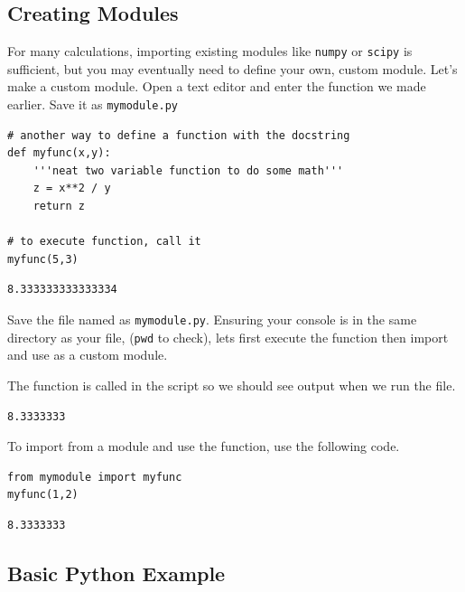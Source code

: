 \documentclass[%
oneside,                 %
final,                   %
10pt]{article}
\begin{document}
\subsection{Creating Modules}

For many calculations, importing existing modules like \texttt{numpy} or \texttt{scipy} is sufficient, but you may eventually need to define your own, custom module. Let's make a custom module. Open a text editor and enter the function we made earlier. Save it as \texttt{mymodule.py}

\begin{Verbatim}[numbers=none,fontsize=\fontsize{9pt}{9pt},baselinestretch=0.95,xleftmargin=2mm]
# another way to define a function with the docstring
def myfunc(x,y):
    '''neat two variable function to do some math'''
    z = x**2 / y
    return z

# to execute function, call it
myfunc(5,3)
\end{Verbatim}

\begin{Verbatim}[numbers=none,fontsize=\fontsize{9pt}{9pt},baselinestretch=0.95,xleftmargin=2mm]
8.333333333333334
\end{Verbatim}

Save the file named as \texttt{mymodule.py}. Ensuring your console is in the same directory as your file, (\texttt{pwd} to check), lets first execute the function then import and use as a custom module.

The function is called in the script so we should see output when we run the file.
\begin{Verbatim}[numbers=none,fontsize=\fontsize{9pt}{9pt},baselinestretch=0.95,xleftmargin=2mm]
8.3333333
\end{Verbatim}

To import from a module and use the function, use the following code.

\begin{Verbatim}[numbers=none,fontsize=\fontsize{9pt}{9pt},baselinestretch=0.95,xleftmargin=2mm]
from mymodule import myfunc
myfunc(1,2)
\end{Verbatim}

\begin{Verbatim}[numbers=none,fontsize=\fontsize{9pt}{9pt},baselinestretch=0.95,xleftmargin=2mm]
8.3333333
\end{Verbatim}

\subsection{Basic Python Example}
\end{document}
